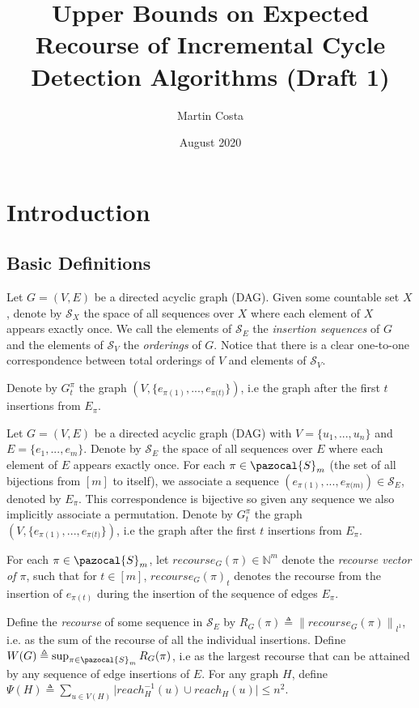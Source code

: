 \documentclass{article}
\title{Upper Bounds on Expected Recourse of Incremental Cycle Detection Algorithms (Draft 1)}
\author{Martin Costa}
\date{August 2020}
\newcommand{\norm}[1]{\left\lVert#1\right\rVert}
\begin{document}
\maketitle

\section{Introduction}

\subsection{Basic Definitions}

Let $G=(V,E)$ be a directed acyclic graph (DAG). Given some countable set $X$, denote by $\mathcal{S}_{X}$ the space of all sequences over $X$ where each element of $X$ appears exactly once. We call the elements of $\mathcal S_E$ the \textit{insertion sequences} of $G$ and the elements of $\mathcal S_V$ the \textit{orderings} of $G$. Notice that there is a clear one-to-one correspondence between total orderings of $V$ and elements of $\mathcal S_V$.

Denote by $G^{\pi}_{t}$ the graph $(V, \{ e_{\pi(1)},...,e_{\pi{(t})} \})$, i.e the graph after the first $t$ insertions from $E_{\pi}$.

Let $G=(V,E)$ be a directed acyclic graph (DAG) with $V=\{ u_{1},...,u_{n}\}$ and $E=\{ e_{1},...,e_{m}\}$. Denote by $\mathcal{S}_{E}$ the space of all sequences over $E$ where each element of $E$ appears exactly once. For each $\pi \in \pazocal{S}_{m}$ (the set of all bijections from $[m]$ to itself), we associate a sequence $(e_{\pi(1)},...,e_{\pi{(m})})\in \mathcal{S}_{E}$, denoted by $E_{\pi}$. This correspondence is bijective so given any sequence we also implicitly associate a permutation. Denote by $G^{\pi}_{t}$ the graph $(V, \{ e_{\pi(1)},...,e_{\pi{(t})} \})$, i.e the graph after the first $t$ insertions from $E_{\pi}$.

For each $\pi \in \pazocal{S}_{m}$, let $recourse_{G}(\pi) \in \mathbb{N}^{m}$ denote the \textit{recourse vector of $\pi$}, such that for $t \in [m]$, $recourse_{G}(\pi)_{t}$ denotes the recourse from the insertion of $e_{\pi(t)}$ during the insertion of the sequence of edges $E_{\pi}$.

Define the \textit{recourse} of some sequence in $\mathcal{S}_{E}$ by $R_{G}(\pi) \triangleq \norm{recourse_{G}(\pi)}_{l^1}$, i.e. as the sum of the recourse of all the individual insertions. Define $W(G) \triangleq \sup_{\pi \in \pazocal{S}_{m}} {R_{G}(\pi)}$, i.e as the largest recourse that can be attained by any sequence of edge insertions of $E$. For any graph $H$, define $\Psi(H) \triangleq \sum_{u \in V(H)}\vert reach_{H}^{-1}(u) \cup reach_{H}(u) \vert \leq n^{2}$.
\end{document}
